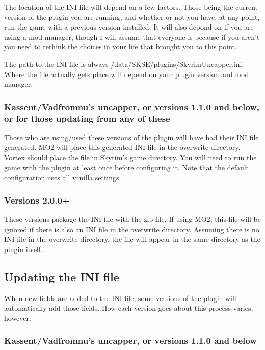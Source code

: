 \documentclass[12pt]{amsart}
\begin{document}
The location of the INI file will depend on a few factors. Those being the
current version of the plugin you are running, and whether or not you have,
at any point, run the game with a previous version installed. It will also
depond on if you are using a mod manager, though I will assume that everyone
is because if you aren't you need to rethink the choices in your life that
brought you to this point.

The path to the INI file is always /data/SKSE/plugins/SkyrimUncapper.ini.
Where the file actually gets place will depend on your plugin version and
mod manager.
\stopblock

\startblock
\subsubsection{Kassent/Vadfromnu's uncapper, or versions 1.1.0 and below, or for those updating from any of these}

Those who are using/used these versions of the plugin will have had their
INI file generated. MO2 will place this generated INI file in the overwrite
directory. Vortex should place the file in Skyrim's game directory. You will
need to run the game with the plugin at least once before configuring it.
Note that the default configuration uses all vanilla settings.
\stopblock

\startblock
\subsubsection{Versions 2.0.0+}

These versions package the INI file with the zip file. If using MO2, this file
will be ignored if there is also an INI file in the overwrite directory.
Assuming there is no INI file in the overwrite directory, the file will appear
in the same directory as the plugin itself.
\stopblock

\startblock
\subsection{Updating the INI file}

When new fields are added to the INI file, some versions of the plugin will
automatically add those fields. How each version goes about this process
varies, however.
\stopblock

\startblock
\subsubsection{Kassent/Vadfromnu's uncapper, or versions 1.1.0 and below}
\end{document}
